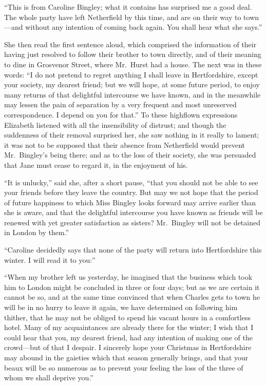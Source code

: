 ``This is from Caroline Bingley; what it contains has surprised me
a good deal.  The whole party have left Netherfield by this time,
and are on their way to town---and without any intention of coming
back again.  You shall hear what she says.''

She then read the first sentence aloud, which comprised the
information of their having just resolved to follow their brother
to town directly, and of their meaning to dine in Grosvenor
Street, where Mr.\ Hurst had a house.  The next was in these
words: ``I do not pretend to regret anything I shall leave in
Hertfordshire, except your society, my dearest friend; but we
will hope, at some future period, to enjoy many returns of that
delightful intercourse we have known, and in the meanwhile may
lessen the pain of separation by a very frequent and most
unreserved correspondence.  I depend on you for that.''  To
these highflown expressions Elizabeth listened with all the
insensibility of distrust; and though the suddenness of their
removal surprised her, she saw nothing in it really to lament;
it was not to be supposed that their absence from Netherfield
would prevent Mr.\ Bingley's being there; and as to the loss of
their society, she was persuaded that Jane must cease to regard
it, in the enjoyment of his.

``It is unlucky,'' said she, after a short pause, ``that you should
not be able to see your friends before they leave the country.
But may we not hope that the period of future happiness to
which Miss Bingley looks forward may arrive earlier than she is
aware, and that the delightful intercourse you have known as
friends will be renewed with yet greater satisfaction as sisters?
Mr.\ Bingley will not be detained in London by them.''

``Caroline decidedly says that none of the party will return into
Hertfordshire this winter.  I will read it to you:''

``When my brother left us yesterday, he imagined that the
business which took him to London might be concluded in three
or four days; but as we are certain it cannot be so, and at the
same time convinced that when Charles gets to town he will be
in no hurry to leave it again, we have determined on following
him thither, that he may not be obliged to spend his vacant hours
in a comfortless hotel.  Many of my acquaintances are already
there for the winter; I wish that I could hear that you, my dearest
friend, had any intention of making one of the crowd---but of
that I despair.  I sincerely hope your Christmas in Hertfordshire
may abound in the gaieties which that season generally brings,
and that your beaux will be so numerous as to prevent your
feeling the loss of the three of whom we shall deprive you.''

